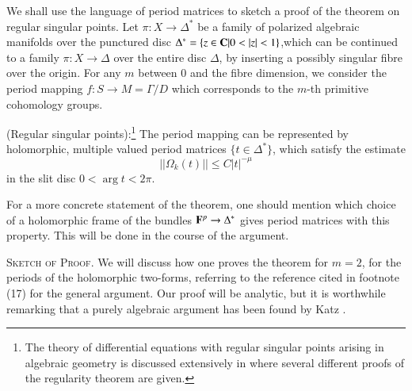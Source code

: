 We shall use the language of period matrices to sketch a proof of the theorem on regular singular points. Let $\pi : X \to \Delta^\ast$  be a family of polarized algebraic manifolds over the punctured disc $\Delta^\ast = \{z \in \mathbf{C} | 0 < |z| < 1\}$,\pageoriginale which can be continued to a family $\pi :X \to \Delta$ over the entire disc $\Delta$, by inserting a possibly  singular fibre over the origin. For any $m$ between 0 and the fibre dimension, we consider the period mapping $f : S \to M = \Gamma / D$ which corresponds to the $m$-th primitive cohomology groups.

\begin{theorem}\label{art4-lem3.31}
(Regular singular points):\footnote[17]{The theory of differential equations with regular singular points arising in algebraic geometry is discussed extensively in \cite{art4-key15} where several different proofs of the regularity theorem are given.} The period mapping can be represented by holomorphic, multiple valued period matrices $\{t \in \Delta^\ast\}$, which satisfy the estimate
$$
||\Omega_{k} (t) || \leqslant C |t|^{-\mu}
$$
in the slit disc $0< \arg t < 2\pi$.
\end{theorem}

\begin{remark*}
For a more concrete statement of the theorem, one should mention which choice of a holomorphic frame of the bundles $\mathbf{F}^p \to \Delta^\ast$ gives period matrices with this property. This will be done in the course of the argument.
\end{remark*}

\medskip
\textsc{Sketch of Proof.} We will discuss how one proves the theorem for $m = 2$, \ie for the periods of the holomorphic two-forms, referring to the reference cited in footnote (17) for the general argument. Our proof will be analytic, but it is worthwhile remarking that a purely algebraic argument has been found by Katz \cite{art4-key31}.

